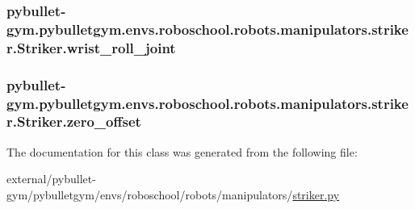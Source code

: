 \subsubsection[{\texorpdfstring{wrist\+\_\+roll\+\_\+joint}{wrist_roll_joint}}]{\setlength{\rightskip}{0pt plus 5cm}pybullet-\/gym.\+pybulletgym.\+envs.\+roboschool.\+robots.\+manipulators.\+striker.\+Striker.\+wrist\+\_\+roll\+\_\+joint}\hypertarget{classpybullet-gym_1_1pybulletgym_1_1envs_1_1roboschool_1_1robots_1_1manipulators_1_1striker_1_1_striker_a08bf8c276770bdad250516d8e3890965}{}\label{classpybullet-gym_1_1pybulletgym_1_1envs_1_1roboschool_1_1robots_1_1manipulators_1_1striker_1_1_striker_a08bf8c276770bdad250516d8e3890965}
\subsubsection[{\texorpdfstring{zero\+\_\+offset}{zero_offset}}]{\setlength{\rightskip}{0pt plus 5cm}pybullet-\/gym.\+pybulletgym.\+envs.\+roboschool.\+robots.\+manipulators.\+striker.\+Striker.\+zero\+\_\+offset}\hypertarget{classpybullet-gym_1_1pybulletgym_1_1envs_1_1roboschool_1_1robots_1_1manipulators_1_1striker_1_1_striker_a4336b3e58f69a8cf16f83029bad605f4}{}\label{classpybullet-gym_1_1pybulletgym_1_1envs_1_1roboschool_1_1robots_1_1manipulators_1_1striker_1_1_striker_a4336b3e58f69a8cf16f83029bad605f4}


The documentation for this class was generated from the following file\+:\begin{DoxyCompactItemize}
\item 
external/pybullet-\/gym/pybulletgym/envs/roboschool/robots/manipulators/\hyperlink{roboschool_2robots_2manipulators_2striker_8py}{striker.\+py}\end{DoxyCompactItemize}
